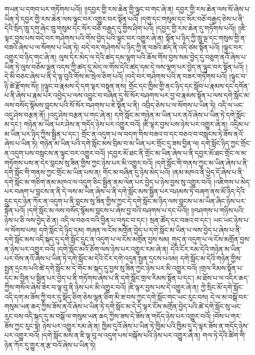 གཡན་པ་དགབ་པར་གཏོགས་པའོ།། །།དབྱར་གྱི་རས་ཆེན་གྱི་ལྟུང་བ་གང་ཞེ་ན། དབྱར་གྱི་རས་ཆེན་ལས་སོ་ཞེས་པ་ཡིན་ཏེ་དབྱར་གྱི་རས་ཆེན་ལས་ལྟུང་བར་འགྱུར་བར་སྟོན་པའོ། །དགུ་དང་གསུམ་དང་སོར་བཅོ་བརྒྱད་ཅེས་པ་ནི་དེའི་སྲིད་ཁྲུ་དགུ་ཞེང་ཁྲུ་གསུམ་དང་སོར་བཅོ་བརྒྱད་དུ་གྱིས་ཤིག་པའོ། །དབྱར་གྱི་རས་ཆེན་དུ་གཏོགས་པའོ།། །།ཇི་ལྟར་བྱས་པས་བདེ་བར་གཤེགས་པའི་གོས་བྱེད་པའི་ལྟུང་བར་འགྱུར་ཞེ་ན། སྟོན་པ་ཉིད་ཀྱི་ཁྲུ་ལྔ་དང་གསུམ་གྱི་ན་བཟའོ་ཞེས་པ་ལ་སོགས་པ་ཡིན་ཏེ། བདེ་བར་གཤེགས་པ་ཉིད་ཀྱི་ན་བཟའི་ཚད་ནི་འདི་ཙམ་སྟོན་པའོ། །ལྟུང་བར་འགྱུར་བ་ཉིད་གང་ཞེ་ན། ལུས་དེར་མེད་ལ་དེའི་ཚད་དམ་ལྷག་པའི་ཆོས་གོས་བྱས་སམ་བྱེད་དུ་བཅུག་ནའོ་ཞེས་པ་ཡིན་ཏེ་ལུས་བཅོམ་ལྡན་འདས་ཀྱི་ཚད་དུ་མེད་ལ་གོས་དེའི་ཚད་དམ་དེ་ལས་ལྷག་པར་བྱེད་ན་ལྟུང་བར་སྟོན་པའོ། །དེ་མི་བཅང་ཞེས་པ་ནི་དེ་ལྟ་བུའི་གོས་མ་སྲེལ་ཅིག་པའོ། །བདེ་བར་གཤེགས་པའི་ན་བཟར་གཏོགས་པའོ། །ལྟུང་བ་ཉི་ཚེ་རྫོགས་སོ།། །།ལྟུང་བ་རྣམས་དེ་དག་ལྟར་བསྟན་ནས། གྲོང་དང་ཁྱིམ་གྱི་ནང་ཉིད་དང་སློབ་པ་རྣམས་དང་དགོན་པ་ནི་ཞེས་པ་རྣམ་པར་འབྱེད་པ་ལས་འབྱུང་བ་བཞིན་དུ་སོ་སོར་བཤགས་པར་བྱ་བ་རྣམས་སྟོན་པ་ལས་དགེ་སློང་མ་ལས་བསོད་སྙོམས་བླངས་པའི་སོ་སོར་བཤགས་པ་ཇེ་སྟོན་པ་ནི། འབྲིད་ཅེས་པ་ལ་སོགས་པ་ཡིན་ཏེ། འདི་ལ་ཡང་འདུ་ཤེས་བརྩན་ནོ། །འདུ་ཤེས་བརྩན་པ་གང་ཞེ་ན། དགེ་སློང་མ་གཉེན་མ་ཡིན་པར་ནའོ་ཞེས་པ་ཡིན་ཏེ་དགེ་སློང་མ་དང་། གཉེན་མ་ཡིན་པར་ཤེས་ན་གདོད་ཉེས་པར་འགྱུར་བའོ། །ཇི་ལྟར་བྱས་པས་ཉེས་པར་འགྱུར་ཞེ་ན། འདྲིམ་པ་མ་ཡིན་པར་ཉིད་ཀྱིས་སྦྱིན་པ་དང་། གྲོང་ན་འདུག་པ་ལ་བདག་གིས་བཟའ་བ་དང་བཅའ་བ་བསླངས་ཏེ་ཟོས་ནའོ་ཞེས་པ་ཡིན་ཏེ། གཉེན་མ་ཡིན་པའི་དགེ་སློང་མས་བྲིམ་བ་མ་ཡིན་པར་གྲོང་དུ་ཟས་བྱིན་ལ། དགེ་སློང་ཉིད་ཀྱང་གྲོང་ན་འདུག་པས་བསླངས་ན་ལྟུང་བར་འགྱུར་བའོ། །དབྱར་མོ་ཐང་ནི་གྲོང་མ་ཡིན་ཞེས་པ་ནི་དབྱར་མོ་ཐང་གྲོང་ལ་མ་གཏོགས་པས་ན་དེར་བླངས་སུ་ཟིན་གྱིས་ཀྱང་ཉེས་པར་མི་འགྱུར་བའོ། །དགེ་སློང་གི་གནས་ཀྱང་མ་ཡིན་ཞེས་པ་ནི་དགེ་སློང་གི་གནས་ཀྱང་གྲོང་མ་ཡིན་པས་ན། གོང་མ་བཞིན་དུ་ཉེས་མེད་པའོ། །ནམ་མཁའ་ནི་ཕྱེད་དོ་ཞེས་པ་ནི་དགེ་སློང་མ་གཅིག་ནམ་མཁའ་ལ་འདུག་ཅིང་སྦྱིན་ནམ་ལེན་པར་བྱེད་པ་ཉེས་བྱས་སུ་འགྱུར་བའོ། །འཇིགས་པ་མེད་པར་བཞག་པ་བླངས་ན་ནི་དེ་ལས་མ་ཡིན་ཞེས་པ་ནི་དགེ་སློང་མས་སྦྱིན་པར་བཤམས་ཏེ་བཞག་ནས་མོ་ཉིད་དེའི་དྲུང་དང་ཉེན་ཀོར་ན་འདུག་པ་ནི་བླངས་སུ་ཟིན་གྱིས་ཀྱང་དེ་དགེ་སློང་མ་ཉིད་ལས་བླངས་པ་མ་ཡིན་ཞིང་ཉེས་པར་སྟོན་པའོ། །དགེ་སློང་མ་ལས་བསོད་སྙོམས་བླངས་པ་ཞེས་བྱ་བའི་བཤགས་པ་དང་པོའོ།། །།བཤགས་པ་གཉིས་པའི་ཉེས་པ་ཅི་ལས་བྱེད་ཅེ་ན། འདི་ལ་བཅའ་བའི་བྱིན་པ་བཏུང་བ་དང་། སྲན་ཚོད་དང་བཟའ་བ་དང་། ཡང་ཡང་ཉེས་པ་ལ་སོགས་པས། དགེ་སློང་དེ་ཉིད་དམ། གཞན་ལ་ངོས་མགྲོན་བྱེད་པ་དགེ་སློང་མ་ཡིན་པ་ལས་བྱེད་པ་ཞེས་པ་ནི་དགེ་སློང་མས་འདི་སྐད་དུ་དགེ་སློང་དྲུང་ན་འདུག་པ་ལ་ངོས་མགྲོན་བྱས་སམ། གུད་ན་འདུག་པ་ལ་ངོས་མགྲོན་བྱས་ན་ཉེས་པར་འགྱུར་བའོ། །དགེ་སློང་མའོ་ཅོག་ལས་ཉེས་པར་འགྱུར་རམ་ཞེ་ན། དེའི་ངོར་རམ་དེའི་གཉེན་མ་ཡིན་པར་བོས་ནའོ་ཞེས་པ་ཡིན་ཏེ་དགེ་སློང་མ་དེའི་ངོར་དགེ་འདུན་སྤྱན་དྲངས་པའམ། དགེ་སློང་མ་དེའི་གཉེན་གྱིས་སྤྱན་དྲངས་པའི་ཚེ་དགེ་སློང་མ་དེ་གོང་མ་སྐད་དུ་བྱས་སུ་ཟིན་ཀྱང་ཉེས་པར་མི་འགྱུར་བའོ། །གྲལ་རིམས་སྟོན་པ་དང་མ་བྱིན་པ་སྦྱིན་པར་བྱེད་པ་ནི་གཏོགས་ཞེས་པ་ནི་དགེ་སློང་གྲལ་རིམས་སྟོན་པ་དང་། མ་ཐོས་པ་ལ་འདིར་ཆད་ཀྱིས་གསོལ་ཞེས་ཟེར་བ་ལྟ་བུ་ནི་ཉེས་པར་མི་འགྱུར་བའོ། །ཇི་ལྟར་བྱས་པས་དེ་འགྱུར་ཞེ་ན། ཀྱེ་སྲིང་མོ་དགེ་སློང་འདི་དག་མ་ཟོས་ཀྱི་བར་དུ་སྡོད་ཅིག་ཅེས་ལྷན་ཅིག་མི་ཟ་བས་ཀྱང་དགེ་སློང་གང་ཡང་རུང་བས། དེ་ལ་མ་བསྒོ་བར་གསུམ་ཡན་ཆད་ཀྱིས་ཟོས་ནའོ་ཞེས་པ་ཡིན་ཏེ་དགེ་སློང་མ་དེ་དེ་ལྟར་ངོས་མགྲོན་བྱེད་པའི་ཚེ་དགེ་སློང་སུ་ཡང་རུང་བས་འདི་སྐད་དུ་མ་བསྒོ་ལ་གསུམ་ཡན་ཆད་ཀྱིས་ཟས་དེ་ཟོས་ན་གདོད་ཉེས་པར་འགྱུར་བའོ། །བོས་པ་གར་ཟོས་ཀྱང་རུང་སྟེ། ཉེས་པར་འགྱུར་རམ་ཞེ་ན། ཁྱིམ་དུའོ་ཞེས་པ་ཡིན་ཏེ་ཁྱིམ་པའི་ཁྱིམ་དུ་དེ་ལྟར་ཟོས་ན་གདོད་ཉེས་པར་འགྱུར་བའོ། །དགེ་སློང་མས་ན་ཇི་ལྟ་བུ་ལ་འདུག་པས་བསྐོས་པའི་ཉེས་པར་འགྱུར་ཞེ་ན། གལ་ཏེ་དེའི་ཚིག་གི་ཉེན་ཀོར་དུ་གྱུར་ན་རྩ་བའོ་ཞེས་པ་ཡིན་ཏེ། 